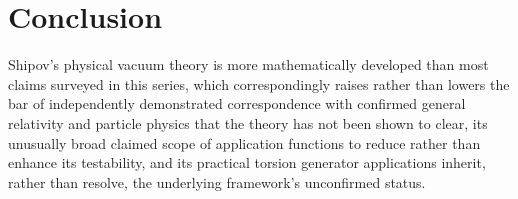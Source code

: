 \documentclass[11pt]{article}
\begin{document}
\section{Conclusion}

Shipov's physical vacuum theory is more mathematically developed than most claims surveyed in this series, which correspondingly raises rather than lowers the bar of independently demonstrated correspondence with confirmed general relativity and particle physics that the theory has not been shown to clear, its unusually broad claimed scope of application functions to reduce rather than enhance its testability, and its practical torsion generator applications inherit, rather than resolve, the underlying framework's unconfirmed status.
\end{document}
